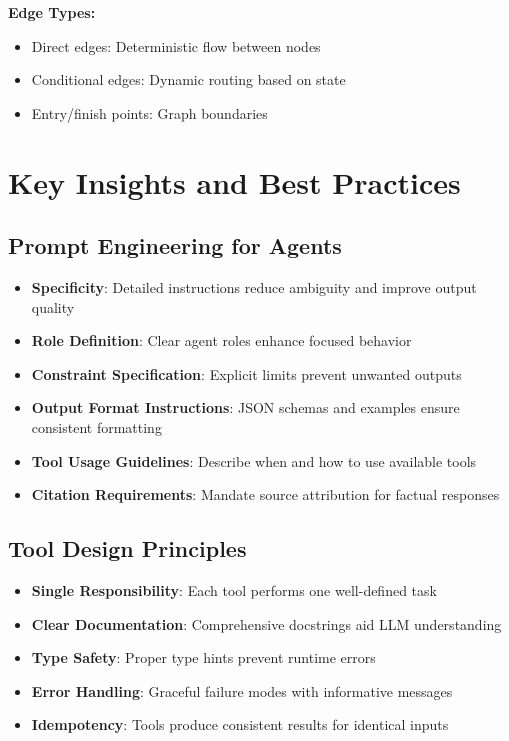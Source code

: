 \documentclass[12pt,a4paper]{article}
\begin{document}
\textbf{Edge Types:}
\begin{itemize}
    \item Direct edges: Deterministic flow between nodes
    \item Conditional edges: Dynamic routing based on state
    \item Entry/finish points: Graph boundaries
\end{itemize}

\section{Key Insights and Best Practices}

\subsection{Prompt Engineering for Agents}

\begin{itemize}
    \item \textbf{Specificity}: Detailed instructions reduce ambiguity and improve output quality
    \item \textbf{Role Definition}: Clear agent roles enhance focused behavior
    \item \textbf{Constraint Specification}: Explicit limits prevent unwanted outputs
    \item \textbf{Output Format Instructions}: JSON schemas and examples ensure consistent formatting
    \item \textbf{Tool Usage Guidelines}: Describe when and how to use available tools
    \item \textbf{Citation Requirements}: Mandate source attribution for factual responses
\end{itemize}

\subsection{Tool Design Principles}

\begin{itemize}
    \item \textbf{Single Responsibility}: Each tool performs one well-defined task
    \item \textbf{Clear Documentation}: Comprehensive docstrings aid LLM understanding
    \item \textbf{Type Safety}: Proper type hints prevent runtime errors
    \item \textbf{Error Handling}: Graceful failure modes with informative messages
    \item \textbf{Idempotency}: Tools produce consistent results for identical inputs
\end{itemize}
\end{document}
